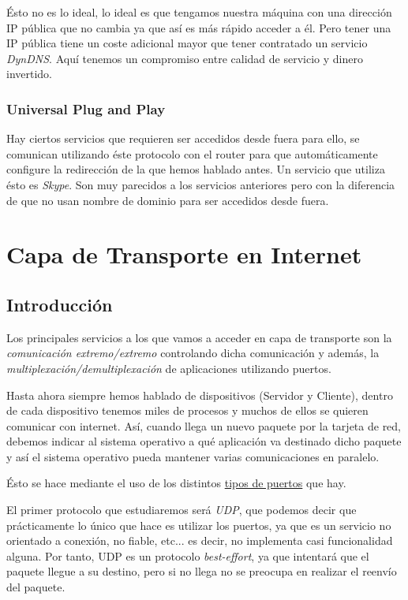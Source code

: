 \documentclass[10pt,a4paper,spanish]{report}
\begin{document}
Ésto no es lo ideal, lo ideal es que tengamos nuestra máquina con una dirección IP pública que no cambia ya que así es más rápido acceder a él. Pero tener una IP pública tiene un coste adicional mayor que tener contratado un servicio \textcolor{tema2}{\textit{DynDNS}}. Aquí tenemos un compromiso entre calidad de servicio y dinero invertido.

\subsection{\textcolor{tema2}Universal Plug and Play}
Hay ciertos servicios que requieren ser accedidos desde fuera para ello, se comunican utilizando éste protocolo con el router para que automáticamente configure la redirección de la que hemos hablado antes. Un servicio que utiliza ésto es \textcolor{tema2}{\textit{Skype}}. Son muy parecidos a los servicios anteriores pero con la diferencia de que no usan nombre de dominio para ser accedidos desde fuera.

\chapter{\textcolor{tema3}{Capa de Transporte en Internet}}
\section{\textcolor{tema3}Introducción}
Los principales servicios a los que vamos a acceder en capa de transporte son la \textit{\textcolor{tema3}{comunicación extremo/extremo}} controlando dicha comunicación y además, la \textit{\textcolor{tema3}{multiplexación/demultiplexación}} de aplicaciones utilizando puertos.

Hasta ahora siempre hemos hablado de dispositivos (Servidor y Cliente), dentro de cada dispositivo tenemos miles de procesos y muchos de ellos se quieren comunicar con internet. Así, cuando llega un nuevo paquete por la tarjeta de red, debemos indicar al sistema operativo a qué aplicación va destinado dicho paquete y así el sistema operativo pueda mantener varias comunicaciones en paralelo.

Ésto se hace mediante el uso de los distintos \hyperref[portskind]{tipos de puertos} que hay.

El primer protocolo que estudiaremos será \textcolor{tema3}{\textit{UDP}}, que podemos decir que prácticamente lo único que hace es utilizar los puertos, ya que es un servicio no orientado a conexión, no fiable, etc... es decir, no implementa casi funcionalidad alguna. Por tanto, UDP es un protocolo \textit{\textcolor{tema3}{best-effort}}, ya que intentará que el paquete llegue a su destino, pero si no llega no se preocupa en realizar el reenvío del paquete.
\end{document}
